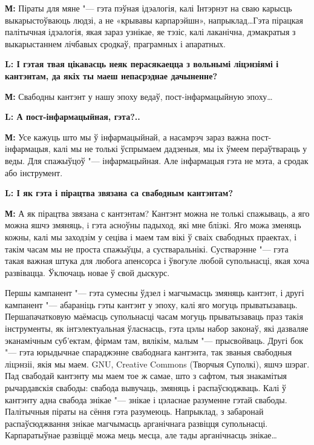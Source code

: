 \documentclass[10pt, a5paper]{article}
\begin{document}
{\noindent \bf М:} Піраты для мяне "--- гэта пэўная ідэалогія, калі Інтэрнэт на сваю карысць выкарыстоўваюць людзі, а не «крывавы карпарэйшн», напрыклад\ldots Гэта пірацкая палітычная ідэалогія, якая зараз узнікае, яе тэзіс, калі лаканічна, дэмакратыя з выкарыстаннем лічбавых сродкаў, праграмных і апаратных.




{\noindent \bf L: І гэтая твая цікавасць неяк перасякаецца з вольнымі ліцэнзіямі і кантэнтам, да якіх ты маеш непасрэднае дачыненне?} 

{\noindent \bf М:}  Свабодны кантэнт у нашу эпоху ведаў, пост-інфармацыйную эпоху\ldots

{\noindent \bf L: А пост-інфармацыйная, гэта?..}

{\noindent \bf М:}  Усе кажуць што мы ў інфармацыйнай, а насамрэч зараз важна пост-інфармацыя, калі мы не толькі ўспрымаем дадзеныя, мы іх ўмеем пераўтвараць у веды. Для спажыўцоў "--- інфармацыйная. Але iнфармацыя гэта не мэта, а сродак або інструмент.

{\noindent \bf L: І як гэта і пірацтва звязана са свабодным кантэнтам?}

{\noindent \bf М:} А як пірацтва звязана с кантэнтам? Кантэнт можна не толькі спажываць, а яго можна яшчэ змяняць, i гэта асноўны падыход, які мне блізкі. Яго можа зменяць кожны, калі мы заходзім у сеціва і маем там вікі ў сваіх свабодных праектах, і такім часам мы не проста спажыўцы, а сустваральнікі. Сустварэнне "--- гэта такая важная штука для любога апенсорса і ўвогуле любой супольнасці, якая хоча развівацца. Ўключаць новае ў свой дыскурс.

Першы кампанент "--- гэта сумесны ўдзел і магчымасць змяняць кантэнт, і другі кампанент "--- абараніць гэты кантэнт у эпоху, калі яго могуць прыватызаваць. Першапачатковую маёмасць супольнасці часам могуць прыватызаваць праз такія інструменты, як інтэлектуальная ўласнасць, гэта цэлы набор законаў, які дазваляе эканамічным суб'ектам, фірмам там, вялікім, малым "--- прысвойваць. Другі бок "--- гэта юрыдычнае спараджэнне свабоднага кантэнта, так званыя свабодныя ліцэнзіі, якія мы маем. GNU, Creative Commons (Творчыя Суполкі), яшчэ шэраг. Пад свабодай кантэнту мы маем тое ж самае, што з сафтом, тыя знакамітыя рычардавскія свабоды: свабода вывучаць, змяняць і распаўсюджваць. Калі ў кантэнту адна свабода знікае "--- знікае і цэласнае разуменне гэтай свабоды. Палітычныя піраты на сёння гэта разумеюць. Напрыклад, з забаронай распаўсюджвання знікае магчымасць арганічнага развіцця супольнасці. Карпаратыўнае развіццё можа мець месца, але тады арганічнасць знікае\ldots
\end{document}
